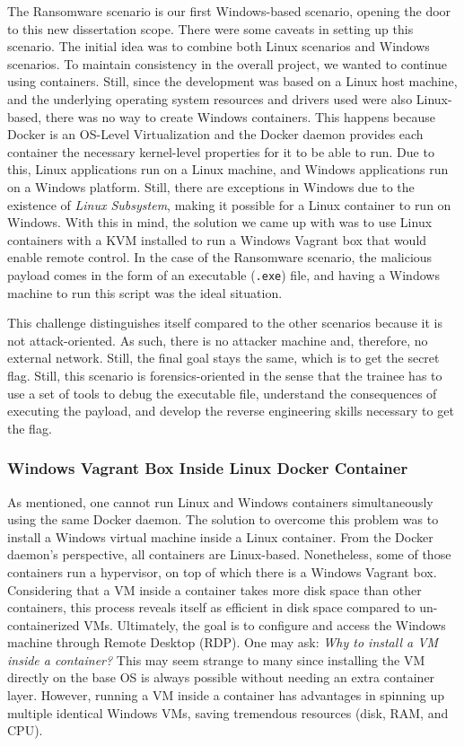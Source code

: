 The Ransomware scenario is our first Windows-based scenario, opening the door to this new dissertation scope. There were some caveats in setting up this scenario. The initial idea was to combine both Linux scenarios and Windows scenarios. To maintain consistency in the overall project, we wanted to continue using containers. Still, since the development was based on a Linux host machine, and the underlying operating system resources and drivers used were also Linux-based, there was no way to create Windows containers. This happens because Docker is an OS-Level Virtualization and the Docker daemon provides each container the necessary kernel-level properties for it to be able to run. Due to this, Linux applications run on a Linux machine, and Windows applications run on a Windows platform. Still, there are exceptions in Windows due to the existence of \textit{Linux Subsystem}, making it possible for a Linux container to run on Windows. With this in mind, the solution we came up with was to use Linux containers with a KVM installed to run a Windows Vagrant box that would enable remote control. In the case of the Ransomware scenario, the malicious payload comes in the form of an executable (\texttt{.exe}) file, and having a Windows machine to run this script was the ideal situation. 

This challenge distinguishes itself compared to the other scenarios because it is not attack-oriented. As such, there is no attacker machine and, therefore, no external network. Still, the final goal stays the same, which is to get the secret flag. Still, this scenario is forensics-oriented in the sense that the trainee has to use a set of tools to debug the executable file, understand the consequences of executing the payload, and develop the reverse engineering skills necessary to get the flag.

\subsubsection{Windows Vagrant Box Inside Linux Docker Container} \label{sec:validation_windows_vagrant_inside_linux_docker}

As mentioned, one cannot run Linux and Windows containers simultaneously using the same Docker daemon. The solution to overcome this problem was to install a Windows virtual machine inside a Linux container. From the Docker daemon's perspective, all containers are Linux-based. Nonetheless, some of those containers run a hypervisor, on top of which there is a Windows Vagrant box. Considering that a VM inside a container takes more disk space than other containers, this process reveals itself as efficient in disk space compared to un-containerized VMs. Ultimately, the goal is to configure and access the Windows machine through Remote Desktop (RDP). One may ask: \textit{Why to install a VM inside a container?} This may seem strange to many since installing the VM directly on the base OS is always possible without needing an extra container layer. However, running a VM inside a container has advantages in spinning up multiple identical Windows VMs, saving tremendous resources (disk, RAM, and CPU).

